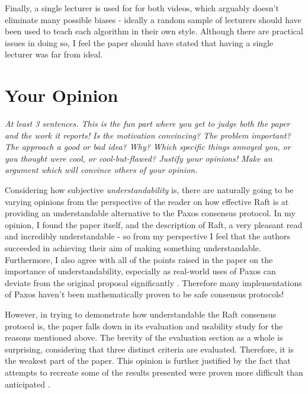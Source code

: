 \documentclass[11pt]{article}
\begin{document}

Finally, a single lecturer is used for for both videos, which arguably doesn't
eliminate many possible biases - ideally a random sample of lecturers should
have been used to teach each algorithm in their own style. Although there are
practical issues in doing so, I feel the paper should have stated that having a
single lecturer was far from ideal.


\section*{Your Opinion}

\textsl{At least 3 sentences. This is the fun part where you get to judge both
the paper and the work it reports! Is the motivation convincing? The problem
important? The approach a good or bad idea? Why? Which specific things annoyed
you, or you thought were cool, or cool-but-flawed? Justify your opinions! Make
an argument which will convince others of your opinion.}

Considering how subjective \textit{understandability} is, there are naturally
going to be varying opinions from the perspective of the reader on how
effective Raft is at providing an understandable alternative to the Paxos
consensus protocol. In my opinion, I found the paper itself, and the
description of Raft, a very pleasant read and incredibly understandable - so
from my perspective I feel that the authors succeeded in achieving their aim of
making something understandable. Furthermore, I also agree with all of the
points raised in the paper on the importance of understandability, especially
as real-world uses of Paxos can deviate from the original proposal
significantly \cite{Chubby} \cite{ZooKeeper}. Therefore many implementations of
Paxos haven't been mathematically proven to be safe consensus protocols!

However, in trying to demonstrate how understandable the Raft consensus
protocol is, the paper falls down in its evaluation and usability study for the
reasons mentioned above. The brevity of the evaluation section as a whole is
surprising, considering that three distinct criteria are evaluated. Therefore,
it is the weakest part of the paper. This opinion is further justified by the
fact that attempts to recreate some of the results presented were proven more
difficult than anticipated \cite{RaftRefloated}.
\end{document}
